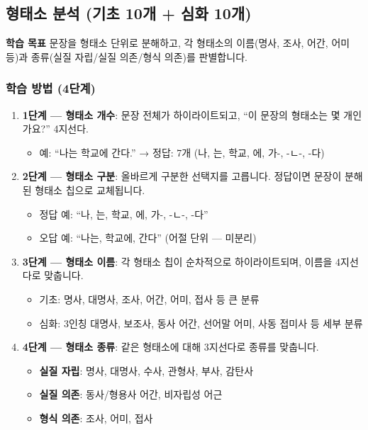 \documentclass[11pt,a4paper]{article}
\newcommand{\goalbox}[1]{%
  \vspace{0.3cm}
  \noindent\colorbox{lightbg}{\parbox{\dimexpr\textwidth-2\fboxsep}{%
    \textbf{\color{korfarm}학습 목표} \quad #1%
  }}
  \vspace{0.3cm}
}
\begin{document}
\newpage
\subsection{형태소 분석 (기초 10개 + 심화 10개)}
\goalbox{문장을 형태소 단위로 분해하고, 각 형태소의 이름(명사, 조사, 어간, 어미 등)과 종류(실질 자립/실질 의존/형식 의존)를 판별합니다.}

\subsubsection{학습 방법 (4단계)}
\begin{enumerate}[nosep,leftmargin=*]
  \item \textbf{1단계 — 형태소 개수}: 문장 전체가 하이라이트되고, ``이 문장의 형태소는 몇 개인가요?'' 4지선다.
    \begin{itemize}[nosep]
      \item 예: ``나는 학교에 간다.'' → 정답: 7개 (나, 는, 학교, 에, 가-, -ㄴ-, -다)
    \end{itemize}
  \item \textbf{2단계 — 형태소 구분}: 올바르게 구분한 선택지를 고릅니다. 정답이면 문장이 분해된 형태소 칩으로 교체됩니다.
    \begin{itemize}[nosep]
      \item 정답 예: ``나, 는, 학교, 에, 가-, -ㄴ-, -다''
      \item 오답 예: ``나는, 학교에, 간다'' (어절 단위 — 미분리)
    \end{itemize}
  \item \textbf{3단계 — 형태소 이름}: 각 형태소 칩이 순차적으로 하이라이트되며, 이름을 4지선다로 맞춥니다.
    \begin{itemize}[nosep]
      \item 기초: 명사, 대명사, 조사, 어간, 어미, 접사 등 큰 분류
      \item 심화: 3인칭 대명사, 보조사, 동사 어간, 선어말 어미, 사동 접미사 등 세부 분류
    \end{itemize}
  \item \textbf{4단계 — 형태소 종류}: 같은 형태소에 대해 3지선다로 종류를 맞춥니다.
    \begin{itemize}[nosep]
      \item \textbf{실질 자립}: 명사, 대명사, 수사, 관형사, 부사, 감탄사
      \item \textbf{실질 의존}: 동사/형용사 어간, 비자립성 어근
      \item \textbf{형식 의존}: 조사, 어미, 접사
    \end{itemize}
\end{enumerate}
\end{document}
